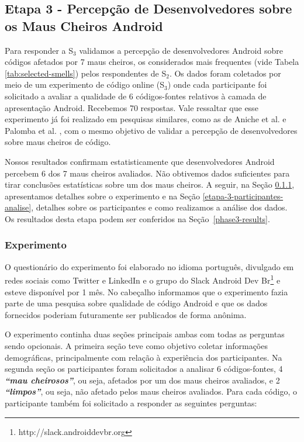 \subsection[Etapa 3 - Percepção de Desenvolvedores sobre os Maus Cheiros]{Etapa 3 - Percepção de Desenvolvedores sobre os Maus Cheiros Android}
\label{etapa-3}

Para responder a S$_3$ validamos a percepção de desenvolvedores Android sobre códigos afetados por 7 maus cheiros, os considerados mais frequentes (vide Tabela \ref{tab:selected-smells}) pelos respondentes de S$_2$. Os dados foram coletados por meio de um experimento de código online (S$_3$) onde cada participante foi solicitado a avaliar a qualidade de 6 códigos-fontes relativos à camada de apresentação Android. Recebemos 70 respostas. Vale ressaltar que esse experimento já foi realizado em pesquisas similares, como as de Aniche et al. \cite{AnicheSmellsMVC:17, MvcSmells:16} e Palomba et al. \cite{Palomba_Do_2014}, com o mesmo objetivo de validar a percepção de desenvolvedores sobre maus cheiros de código.  


Nossos resultados confirmam estatisticamente que desenvolvedores Android percebem 6 dos 7 maus cheiros avaliados. Não obtivemos dados suficientes para tirar conclusões estatísticas sobre um dos maus cheiros. A seguir, na Seção \ref{etapa-3-experimento}, apresentamos detalhes sobre o experimento e na Seção \ref{etapa-3-participantes-analise}, detalhes sobre os participantes e como realizamos a análise dos dados. Os resultados desta etapa podem ser conferidos na Seção~\ref{phase3-results}.


\subsubsection{Experimento}
\label{etapa-3-experimento}

O questionário do experimento foi elaborado no idioma português, divulgado em redes sociais como Twitter e LinkedIn e o grupo do Slack Android Dev Br\footnote{http://slack.androiddevbr.org} e esteve disponível por 1 mês. No cabeçalho informamos que o experimento fazia parte de uma pesquisa sobre qualidade de código Android e que os dados fornecidos poderiam futuramente ser publicados de forma anônima. 

O experimento continha duas seções principais ambas com todas as perguntas sendo opcionais. A primeira seção teve como objetivo coletar informações demográficas, principalmente com relação à experiência dos participantes. Na segunda seção os participantes foram solicitados a analisar 6 códigos-fontes, 4 \textbf{\small \textit{``mau cheirosos''}}, ou seja, afetados por um dos maus cheiros avaliados, e 2 \textbf{\small \textit{``limpos''}}, ou seja, não afetado pelos maus cheiros avaliados. Para cada código, o participante também foi solicitado a responder as seguintes perguntas:

